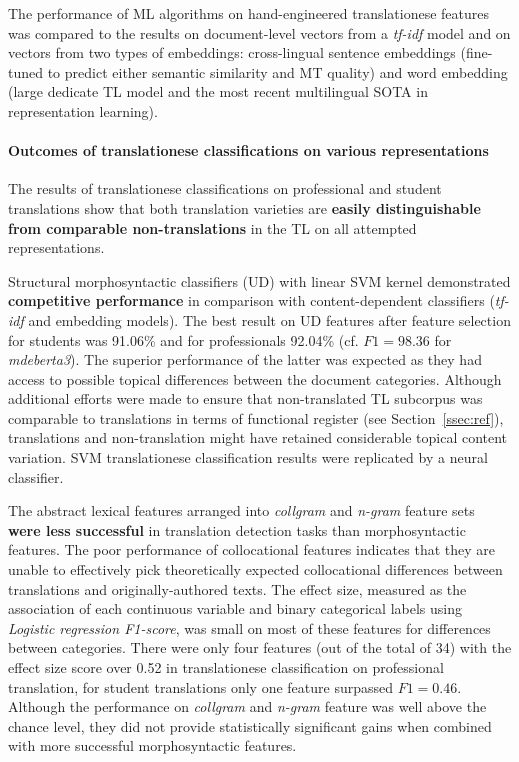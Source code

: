 The performance of ML algorithms on hand-engineered translationese features was compared to the results on document-level vectors from a \textit{tf-idf} model and on vectors from two types of embeddings: cross-lingual sentence embeddings (fine-tuned to predict either semantic similarity and MT quality) and word embedding (large dedicate TL model and the most recent multilingual SOTA in representation learning). 

\paragraph{Outcomes of translationese classifications on various representations} 
The results of translationese classifications on professional and student translations show that both translation varieties are \textbf{easily distinguishable from comparable non-translations} in the TL on all attempted representations. 

Structural morphosyntactic classifiers (UD) with linear SVM kernel demonstrated \textbf{competitive performance} in comparison with content-dependent classifiers (\textit{tf-idf} and embedding models). 
The best result on UD features after feature selection for students was 91.06\% and for professionals 92.04\% (cf. $F1=98.36$ for \textit{mdeberta3}).
The superior performance of the latter was expected as they had access to possible topical differences between the document categories. Although additional efforts were made to ensure that non-translated TL subcorpus was comparable to translations in terms of functional register (see Section~\ref{ssec:ref}), translations and non-translation might have retained considerable topical content variation. SVM translationese classification results were replicated by a neural classifier.

The abstract lexical features arranged into \textit{collgram} and \textit{n-gram} feature sets \textbf{were less successful} in translation detection tasks than morphosyntactic features. 
The poor performance of collocational features indicates that they are unable to effectively pick theoretically expected collocational differences between translations and originally-authored texts. The effect size, measured as the association of each continuous variable and binary categorical labels using \textit{Logistic regression F1-score}, was small on most of these features for differences between categories. There were only four features (out of the total of 34) with the effect size score over 0.52 in translationese classification on professional translation, for student translations only one feature surpassed $F1=0.46$. Although the performance on \textit{collgram} and \textit{n-gram} feature was well above the chance level, they did not provide statistically significant gains when combined with more successful morphosyntactic features. 

